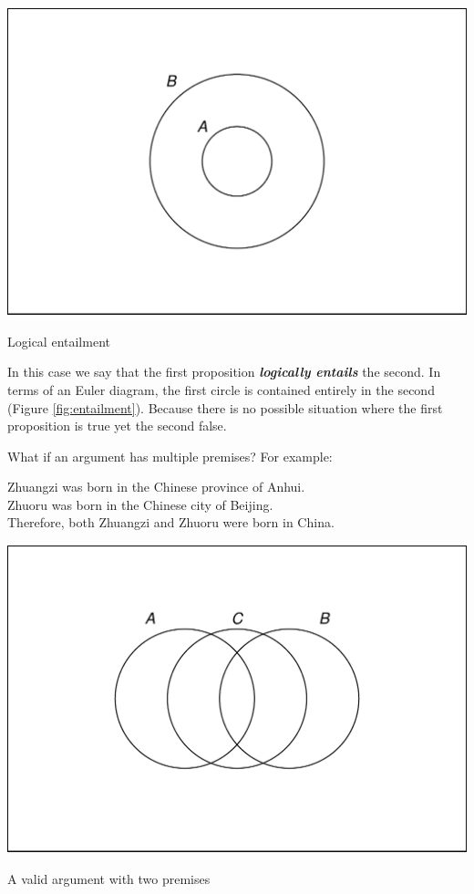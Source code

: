 \documentclass[justified]{tufte-book}
\theoremstyle{definition}
\theoremstyle{definition}
\theoremstyle{definition}
\theoremstyle{definition}
\theoremstyle{remark}
\begin{document}
\begin{marginfigure}
\includegraphics{_main_files/figure-latex/entailment-1} \caption[Logical entailment]{Logical entailment}\label{fig:entailment}
\end{marginfigure}

In this case we say that the first proposition \textbf{\emph{logically entails}} the second. In terms of an Euler diagram, the first circle is contained entirely in the second (Figure \ref{fig:entailment}). Because there is no possible situation where the first proposition is true yet the second false.

What if an argument has multiple premises? For example:

\begin{argument}
Zhuangzi was born in the Chinese province of Anhui.\\
Zhuoru was born in the Chinese city of Beijing.\\
Therefore, both Zhuangzi and Zhuoru were born in China.
\end{argument}

\begin{marginfigure}
\includegraphics{_main_files/figure-latex/validtwopremises-1} \caption[A valid argument with two premises]{A valid argument with two premises}\label{fig:validtwopremises}
\end{marginfigure}
\end{document}
